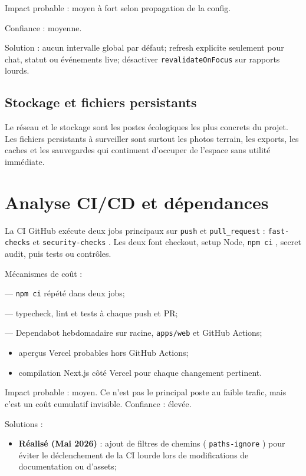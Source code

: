 \documentclass[
  10pt,
  a4paper,
  DIV=11,
  numbers=noendperiod,
  oneside]{scrreprt}
\providecommand{\tightlist}{%
  \setlength{\itemsep}{0pt}\setlength{\parskip}{0pt}}
\let\oldtextbf\textbf
\renewcommand{\textbf}[1]{\oldtextbf{\textcolor{cmmnavy}{#1}}}
\begin{document}
Impact probable : moyen à fort selon propagation de la config.

Confiance : moyenne.

Solution : aucun intervalle global par défaut; refresh explicite
seulement pour chat, statut ou événements live; désactiver
\texttt{revalidateOnFocus} sur rapports lourds.

\subsection{Stockage et fichiers
persistants}\label{stockage-et-fichiers-persistants}

Le réseau et le stockage sont les postes écologiques les plus concrets
du projet. Les fichiers persistants à surveiller sont surtout les photos
terrain, les exports, les caches et les sauvegardes qui continuent
d'occuper de l'espace sans utilité immédiate.

\section{Analyse CI/CD et
dépendances}\label{analyse-cicd-et-duxe9pendances}

La CI GitHub exécute deux jobs principaux sur \texttt{push} et
\texttt{pull\_request} : \texttt{fast-checks} et
\texttt{security-checks} . Les deux font checkout, setup Node,
\texttt{npm\ ci} , secret audit, puis tests ou contrôles.

Mécanismes de coût :

--- \texttt{npm\ ci} répété dans deux jobs;

--- typecheck, lint et tests à chaque push et PR;

--- Dependabot hebdomadaire sur racine, \texttt{apps/web} et GitHub
Actions;

\begin{itemize}
\item
  aperçus Vercel probables hors GitHub Actions;
\item
  compilation Next.js côté Vercel pour chaque changement pertinent.
\end{itemize}

Impact probable : moyen. Ce n'est pas le principal poste au faible
trafic, mais c'est un coût cumulatif invisible. Confiance : élevée.

Solutions :

\begin{itemize}
\tightlist
\item
  \textbf{Réalisé (Mai 2026)} : ajout de filtres de chemins (
  \texttt{paths-ignore} ) pour éviter le déclenchement de la CI lourde
  lors de modifications de documentation ou d'assets;
\end{itemize}
\end{document}
